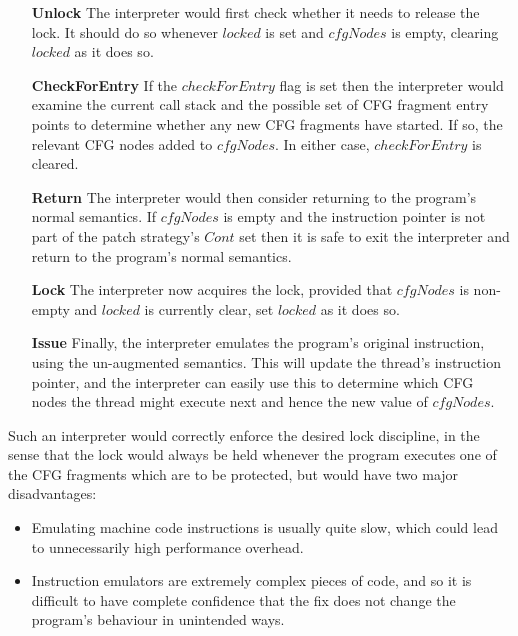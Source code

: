 \begin{itemize}
\item[\textbf{Unlock}] The interpreter would first check whether it
  needs to release the lock.  It should do so whenever $locked$ is set
  and $cfgNodes$ is empty, clearing $locked$ as it does so.
\item[\textbf{CheckForEntry}] If the $checkForEntry$ flag is set then the
  interpreter would examine the current call stack and the possible
  set of CFG fragment entry points to determine whether any new CFG
  fragments have started.  If so, the relevant CFG nodes added to
  $cfgNodes$.  In either case, $checkForEntry$ is cleared.
\item[\textbf{Return}] The interpreter would then consider returning
  to the program's normal semantics.  If $cfgNodes$ is empty and the
  instruction pointer is not part of the patch strategy's $Cont$ set
  then it is safe to exit the interpreter and return to the program's
  normal semantics.
\item[\textbf{Lock}] The interpreter now acquires the lock, provided
  that $cfgNodes$ is non-empty and $locked$ is currently clear, set
  $locked$ as it does so.
\item[\textbf{Issue}] Finally, the interpreter emulates the program's
  original instruction, using the un-augmented semantics.  This will
  update the thread's instruction pointer, and the interpreter can
  easily use this to determine which CFG nodes the thread might
  execute next and hence the new value of $cfgNodes$.
\end{itemize}
  
Such an interpreter would correctly enforce the desired lock
discipline, in the sense that the lock would always be held whenever
the program executes one of the CFG fragments which are to be
protected, but would have two major disadvantages:

\begin{itemize}
\item Emulating machine code instructions is usually quite slow, which
  could lead to unnecessarily high performance overhead.
\item Instruction emulators are extremely complex pieces of code, and
  so it is difficult to have complete confidence that the fix does not
  change the program's behaviour in unintended ways.
\end{itemize}

